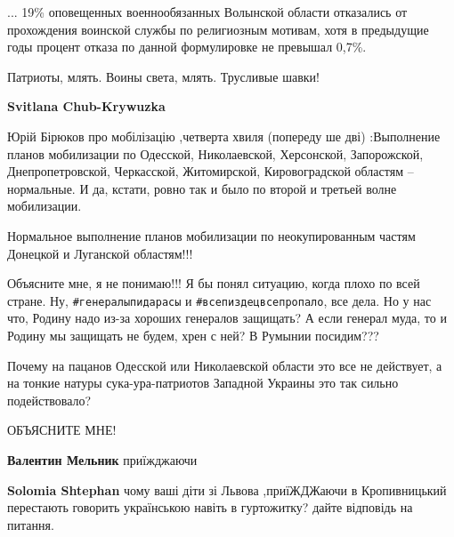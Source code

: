 \begin{itemize}
\begin{itemize}
... 19\% оповещенных военнообязанных Волынской области отказались от прохождения
воинской службы по религиозным мотивам, хотя в предыдущие годы процент отказа
по данной формулировке не превышал 0,7\%.

Патриоты, млять. Воины света, млять. Трусливые шавки!

 
\textbf{Svitlana Chub-Krywuzka} 

Юрій Бірюков про мобілізацію ,четверта хвиля (попереду ше дві) :Выполнение
планов мобилизации по Одесской, Николаевской, Херсонской, Запорожской,
Днепропетровской, Черкасской, Житомирской, Кировоградской областям –
нормальные. И да, кстати, ровно так и было по второй и третьей волне
мобилизации.

Нормальное выполнение планов мобилизации по неокупированным частям Донецкой и Луганской областям!!!

Объясните мне, я не понимаю!!! Я бы понял ситуацию, когда плохо по всей стране.
Ну, \verb|#генералыпидарасы| и \verb|#всепиздецвсепропало|, все дела. Но у нас
что, Родину надо из-за хороших генералов защищать? А если генерал муда, то и
Родину мы защищать не будем, хрен с ней? В Румынии посидим???

Почему на пацанов Одесской или Николаевской области это все не действует, а на
тонкие натуры сука-ура-патриотов Западной Украины это так сильно подействовало?

ОБЪЯСНИТЕ МНЕ!

 
\textbf{Валентин Мельник} приїжджаючи

 
\textbf{Solomia Shtephan} чому ваші діти зі Львова ,приїЖДЖаючи в Кропивницький
перестають говорить українською навіть в гуртожитку? дайте відповідь на
питання.


\end{itemize}
\end{itemize}
